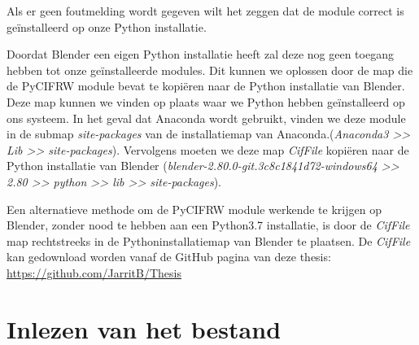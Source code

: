 Als er geen foutmelding wordt gegeven wilt het zeggen dat de module correct is geïnstalleerd op onze Python installatie. 
\par
Doordat Blender een eigen Python installatie heeft zal deze nog geen toegang hebben tot onze geïnstalleerde modules. Dit kunnen we oplossen door de map die de PyCIFRW module bevat te kopiëren naar de Python installatie van Blender. Deze map kunnen we vinden op plaats waar we Python hebben geïnstalleerd op ons systeem. In het geval dat Anaconda wordt gebruikt, vinden we deze module in de submap \textit{site-packages} van de installatiemap van Anaconda.(\textit{Anaconda3 \textgreater \textgreater{} Lib \textgreater \textgreater{} site-packages}).
Vervolgens moeten we deze map \textit{CifFile} kopiëren naar de Python installatie van Blender (\textit{blender-2.80.0-git.3c8c1841d72-windows64 \textgreater \textgreater{} 2.80 \textgreater \textgreater{} python \textgreater \textgreater{} lib \textgreater \textgreater{} site-packages}). 
\par
Een alternatieve methode om de PyCIFRW module werkende te krijgen op Blender, zonder nood te hebben aan een Python3.7 installatie, is door de \textit{CifFile} map rechtstreeks in de Pythoninstallatiemap van Blender te plaatsen. De \textit{CifFile} kan gedownload worden vanaf de GitHub pagina van deze thesis: \url{https://github.com/JarritB/Thesis}
  
\section{Inlezen van het bestand}


